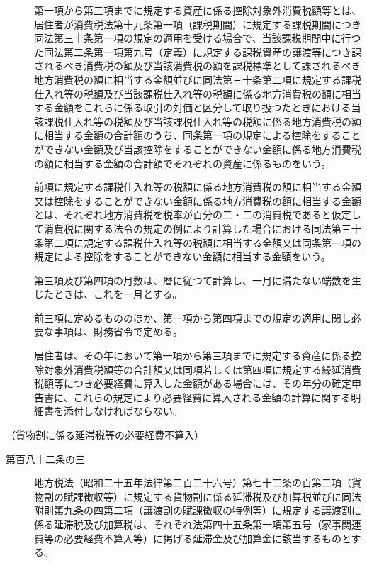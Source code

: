 \documentclass[twocolumn,a4j,10pt]{ltjtarticle}
\begin{document}
\begin{description}
\item[]第一項から第三項までに規定する資産に係る控除対象外消費税額等とは、居住者が消費税法第十九条第一項（課税期間）に規定する課税期間につき同法第三十条第一項の規定の適用を受ける場合で、当該課税期間中に行つた同法第二条第一項第九号（定義）に規定する課税資産の譲渡等につき課されるべき消費税の額及び当該消費税の額を課税標準として課されるべき地方消費税の額に相当する金額並びに同法第三十条第二項に規定する課税仕入れ等の税額及び当該課税仕入れ等の税額に係る地方消費税の額に相当する金額をこれらに係る取引の対価と区分して取り扱つたときにおける当該課税仕入れ等の税額及び当該課税仕入れ等の税額に係る地方消費税の額に相当する金額の合計額のうち、同条第一項の規定による控除をすることができない金額及び当該控除をすることができない金額に係る地方消費税の額に相当する金額の合計額でそれぞれの資産に係るものをいう。
\item[]前項に規定する課税仕入れ等の税額に係る地方消費税の額に相当する金額又は控除をすることができない金額に係る地方消費税の額に相当する金額とは、それぞれ地方消費税を税率が百分の二・二の消費税であると仮定して消費税に関する法令の規定の例により計算した場合における同法第三十条第二項に規定する課税仕入れ等の税額に相当する金額又は同条第一項の規定による控除をすることができない金額に相当する金額をいう。
\item[]第三項及び第四項の月数は、暦に従つて計算し、一月に満たない端数を生じたときは、これを一月とする。
\item[]前三項に定めるもののほか、第一項から第四項までの規定の適用に関し必要な事項は、財務省令で定める。
\item[]居住者は、その年において第一項から第三項までに規定する資産に係る控除対象外消費税額等の合計額又は同項若しくは第四項に規定する繰延消費税額等につき必要経費に算入した金額がある場合には、その年分の確定申告書に、これらの規定により必要経費に算入される金額の計算に関する明細書を添付しなければならない。
\end{description}
\noindent\hspace{10pt}（貨物割に係る延滞税等の必要経費不算入）
\begin{description}
\item[第百八十二条の三]地方税法（昭和二十五年法律第二百二十六号）第七十二条の百第二項（貨物割の賦課徴収等）に規定する貨物割に係る延滞税及び加算税並びに同法附則第九条の四第二項（譲渡割の賦課徴収の特例等）に規定する譲渡割に係る延滞税及び加算税は、それぞれ法第四十五条第一項第五号（家事関連費等の必要経費不算入等）に掲げる延滞金及び加算金に該当するものとする。
\end{description}
\end{document}
